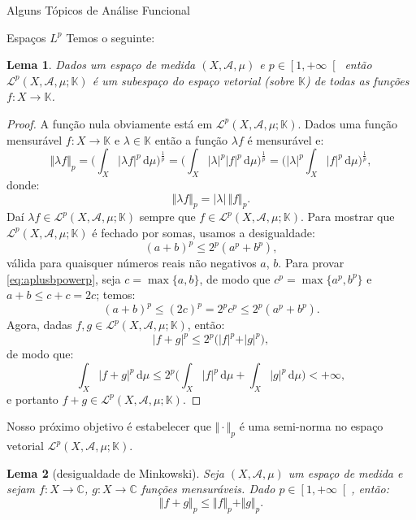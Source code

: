 \documentclass[oneside,final,11pt]{amsbook}
\newcommand{\C}{\mathds C}
\newcommand{\K}{\mathds K}
\newcommand{\dd}{\mathrm d}
\theoremstyle{remark}\newtheorem{exercise}{Exercício}[chapter]
\theoremstyle{remark}\newtheorem{*exercise}[exercise]{\hbox to 0pt{\hskip 0pt minus 1fil*}Exercício}
\theoremstyle{definition}\newtheorem{exdefin}{Definição}[chapter]
\theoremstyle{plain}\newtheorem{teo}{Teorema}[section]
\theoremstyle{plain}\newtheorem{lem}[teo]{Lema}
\theoremstyle{plain}\newtheorem{prop}[teo]{Proposição}
\theoremstyle{plain}\newtheorem{cor}[teo]{Corolário}
\theoremstyle{definition}\newtheorem{defin}[teo]{Definição}
\theoremstyle{remark}\newtheorem{rem}[teo]{Observação}
\theoremstyle{definition}\newtheorem{notation}[teo]{Notação}
\theoremstyle{definition}\newtheorem{convention}[teo]{Convenção}
\theoremstyle{definition}\newtheorem{example}[teo]{Exemplo}
\numberwithin{section}{chapter}
\numberwithin{equation}{section}
\begin{document}
\begin{chapter}{Alguns Tópicos de Análise Funcional}
\begin{section}[Espaços $L^p$]{Espaços ${L^p}$}
Temos o seguinte:
\begin{lem}\label{thm:Lpsubespaco}
Dados um espaço de medida $(X,\mathcal A,\mu)$ e $p\in\left[1,+\infty\right[$ então
$\mathcal L^p(X,\mathcal A,\mu;\K)$ é um subespaço do espaço vetorial (sobre $\K$)
de todas as funções $f:X\to\K$.
\end{lem}
\begin{proof}
A função nula obviamente está em $\mathcal L^p(X,\mathcal A,\mu;\K)$.
Dados uma função mensurável $f:X\to\K$ e $\lambda\in\K$ então a função $\lambda f$
é mensurável e:
\[\Vert\lambda f\Vert_p=\Big(\int_X\vert\lambda f\vert^p\,\dd\mu\Big)^{\frac1p}
=\Big(\int_X\vert\lambda\vert^p\vert f\vert^p\,\dd\mu\Big)^{\frac1p}
=\Big(\vert\lambda\vert^p\int_X\vert f\vert^p\,\dd\mu\Big)^{\frac1p},\]
donde:
\begin{equation}\label{eq:normaplambdaf}
\Vert\lambda f\Vert_p=\vert\lambda\vert\,\Vert f\Vert_p.
\end{equation}
Daí $\lambda f\in\mathcal L^p(X,\mathcal A,\mu;\K)$ sempre que
$f\in\mathcal L^p(X,\mathcal A,\mu;\K)$. Para mostrar que $\mathcal L^p(X,\mathcal A,\mu;\K)$
é fechado por somas, usamos a desigualdade:
\begin{equation}\label{eq:aplusbpowerp}
(a+b)^p\le2^p(a^p+b^p),
\end{equation}
válida para quaisquer números reais não negativos $a$, $b$. Para provar \eqref{eq:aplusbpowerp},
seja $c=\max\{a,b\}$, de modo que $c^p=\max\{a^p,b^p\}$ e $a+b\le c+c=2c$; temos:
\[(a+b)^p\le(2c)^p=2^pc^p\le2^p(a^p+b^p).\]
Agora, dadas $f,g\in\mathcal L^p(X,\mathcal A,\mu;\K)$, então:
\[\vert f+g\vert^p\le2^p\big(\vert f\vert^p+\vert g\vert^p\big),\]
de modo que:
\[\int_X\vert f+g\vert^p\,\dd\mu\le2^p\Big(\int_X\vert f\vert^p\,\dd\mu
+\int_X\vert g\vert^p\,\dd\mu\Big)<+\infty,\]
e portanto $f+g\in\mathcal L^p(X,\mathcal A,\mu;\K)$.
\end{proof}

Nosso próximo objetivo é estabelecer que $\Vert\cdot\Vert_p$ é uma semi-norma
no espaço vetorial $\mathcal L^p(X,\mathcal A,\mu;\K)$.
\begin{lem}[desigualdade de Minkowski]
\label{thm:Minkowski}
Seja $(X,\mathcal A,\mu)$ um espaço de medida e sejam $f:X\to\C$, $g:X\to\C$ funções mensuráveis. Dado
$p\in\left[1,+\infty\right[$, então:
\begin{equation}\label{eq:Minkowski}
\Vert f+g\Vert_p\le\Vert f\Vert_p+\Vert g\Vert_p.
\end{equation}
\end{lem}


\end{section}
\end{chapter}
\end{document}
